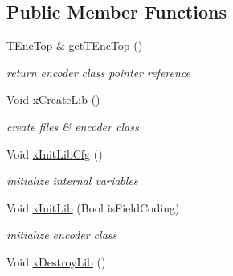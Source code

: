 \subsection*{Public Member Functions}
\begin{DoxyCompactItemize}
\item 
\mbox{\label{class_t_app_enc_top_a4aed66327b4d164ded4f86a33790fff0}} 
\hyperlink{class_t_enc_top}{T\+Enc\+Top} \& \hyperlink{class_t_app_enc_top_a4aed66327b4d164ded4f86a33790fff0}{get\+T\+Enc\+Top} ()
\begin{DoxyCompactList}\small\item\em return encoder class pointer reference \end{DoxyCompactList}\end{DoxyCompactItemize}
\begin{DoxyCompactItemize}
\item 
\mbox{\label{class_t_app_enc_top_a557a8df2c4651809c790117ce5a78359}} 
Void \hyperlink{class_t_app_enc_top_a557a8df2c4651809c790117ce5a78359}{x\+Create\+Lib} ()
\begin{DoxyCompactList}\small\item\em create files \& encoder class \end{DoxyCompactList}\item 
\mbox{\label{class_t_app_enc_top_a5eba16430b0b0d149712a67742f14b69}} 
Void \hyperlink{class_t_app_enc_top_a5eba16430b0b0d149712a67742f14b69}{x\+Init\+Lib\+Cfg} ()
\begin{DoxyCompactList}\small\item\em initialize internal variables \end{DoxyCompactList}\item 
\mbox{\label{class_t_app_enc_top_a225f177d69d5d0063662d34f060296f5}} 
Void \hyperlink{class_t_app_enc_top_a225f177d69d5d0063662d34f060296f5}{x\+Init\+Lib} (Bool is\+Field\+Coding)
\begin{DoxyCompactList}\small\item\em initialize encoder class \end{DoxyCompactList}\item 
\mbox{\label{class_t_app_enc_top_abc08485291d4892647e46cdc369faf2e}} 
Void \hyperlink{class_t_app_enc_top_abc08485291d4892647e46cdc369faf2e}{x\+Destroy\+Lib} ()

\end{DoxyCompactItemize}
